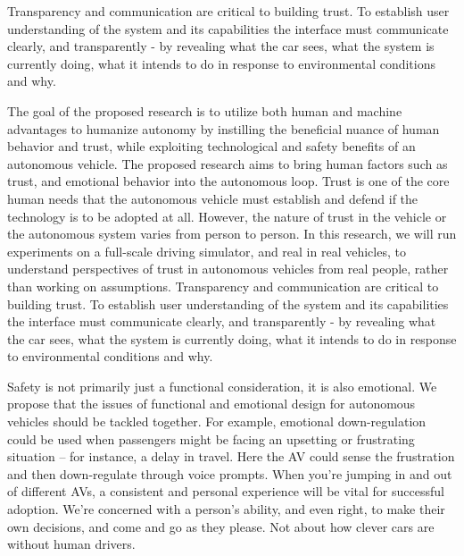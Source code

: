 Transparency and communication are critical to building trust. To establish user understanding of the system and its capabilities the interface must communicate clearly, and transparently - by revealing what the car sees, what the system is currently doing, what it intends to do in response to environmental conditions and why. 

The goal of the proposed research is to utilize both human and machine advantages to humanize autonomy  by instilling the beneficial nuance of human behavior and trust, while exploiting technological and safety benefits of an autonomous vehicle. The proposed research aims to bring human factors such as trust, and emotional behavior into the autonomous loop.   Trust is one of the core human needs that the autonomous vehicle must establish and defend if the technology is to be adopted at all. However, the nature of trust in the vehicle or the autonomous system varies from person to person. In this research, we will run experiments on a full-scale driving simulator, and real in real vehicles, to understand perspectives of trust in autonomous vehicles from real people, rather than working on assumptions. Transparency and communication are critical to building trust. To establish user understanding of the system and its capabilities the interface must communicate clearly, and transparently - by revealing what the car sees, what the system is currently doing, what it intends to do in response to environmental conditions and why. 

Safety is not primarily just a functional consideration, it is also emotional. We propose that the issues of functional and emotional design for autonomous vehicles should be tackled together.
For example, emotional down-regulation could be used when passengers might be facing an upsetting or frustrating situation – for instance, a delay in travel. Here the AV could sense the frustration and then down-regulate through voice prompts. When you’re jumping in and out of different AVs, a consistent and personal experience will be vital for successful adoption.
 We’re concerned with a person’s ability, and even right, to make their own decisions, and come and go as they please. Not about how clever cars are without human drivers. 

